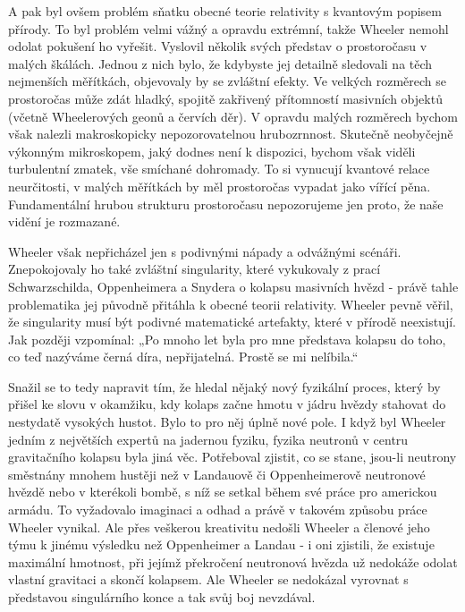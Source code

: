   A pak byl ovšem problém sňatku obecné teorie relativity s kvantovým popisem přírody. To byl
  problém velmi vážný a opravdu extrémní, takže Wheeler nemohl odolat pokušení ho vyřešit. Vyslovil
  několik svých představ o prostoročasu v malých škálách. Jednou z nich bylo, že kdybyste jej
  detailně sledovali na těch nejmenších měřítkách, objevovaly by se zvláštní efekty. Ve velkých
  rozměrech se prostoročas může zdát hladký, spojitě zakřivený přítomností masivních objektů (včetně
  Wheelerových geonů a červích děr). V opravdu malých rozměrech bychom však nalezli makroskopicky
  nepozorovatelnou hrubozrnnost. Skutečně neobyčejně výkonným mikroskopem, jaký dodnes není k
  dispozici, bychom však viděli turbulentní zmatek, vše smíchané dohromady. To si vynucují kvantové
  relace neurčitosti, v malých měřítkách by měl prostoročas vypadat jako vířící pěna. Fundamentální
  hrubou strukturu prostoročasu nepozorujeme jen proto, že naše vidění je rozmazané. 

  Wheeler však nepřicházel jen s podivnými nápady a odvážnými scénáři. Znepokojovaly ho také
  zvláštní singularity, které vykukovaly z prací Schwarzschilda, Oppenheimera a Snydera o kolapsu
  masivních hvězd - právě tahle problematika jej původně přitáhla k obecné teorii relativity.
  Wheeler pevně věřil, že singularity musí být podivné matematické artefakty, které v přírodě
  neexistují. Jak později vzpomínal: „Po mnoho let byla pro mne představa kolapsu do toho, co teď
  nazýváme černá díra, nepřijatelná. Prostě se mi nelíbila.“

  Snažil se to tedy napravit tím, že hledal nějaký nový fyzikální proces, který by přišel ke slovu v
  okamžiku, kdy kolaps začne hmotu v jádru hvězdy stahovat do nestydatě vysokých hustot. Bylo to pro
  něj úplně nové pole. I když byl Wheeler jedním z největších expertů na jadernou fyziku, fyzika
  neutronů v centru gravitačního kolapsu byla jiná věc. Potřeboval zjistit, co se stane, jsou-li
  neutrony směstnány mnohem hustěji než v Landauově či Oppenheimerově neutronové hvězdě nebo v
  kterékoli bombě, s níž se setkal během své práce pro americkou armádu. To vyžadovalo imaginaci a
  odhad a právě v takovém způsobu práce Wheeler vynikal. Ale přes veškerou kreativitu nedošli
  Wheeler a členové jeho týmu k jinému výsledku než Oppenheimer a Landau - i oni zjistili, že
  existuje maximální hmotnost, při jejímž překročení neutronová hvězda už nedokáže odolat vlastní
  gravitaci a skončí kolapsem. Ale Wheeler se nedokázal vyrovnat s představou singulárního konce a
  tak svůj boj nevzdával. 

